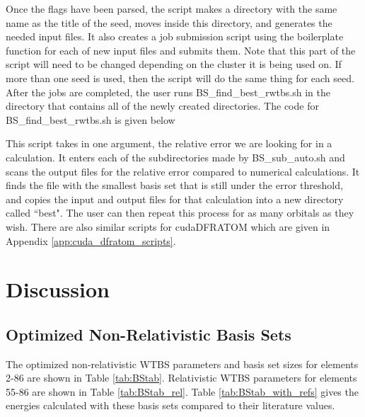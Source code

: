 Once the flags have been parsed, the script makes a directory with the same name as the title of the seed, moves inside this directory, and generates the needed input files. It also creates a job submission script using the boilerplate function for each of new input files and submits them. Note that this part of the script will need to be changed depending on the cluster it is being used on. If more than one seed is used, then the script will do the same thing for each seed. After the jobs are completed, the user runs BS\_find\_best\_rwtbs.sh in the directory that contains all of the newly created directories. The code for BS\_find\_best\_rwtbs.sh is given below



This script takes in one argument, the relative error we are looking for in a calculation. It enters each of the subdirectories made by BS\_sub\_auto.sh and scans the output files for the relative error compared to numerical calculations. It finds the file with the smallest basis set that is still under the error threshold, and copies the input and output files for that calculation into a new directory called ``best". The user can then repeat this process for as many orbitals as they wish. There are also similar scripts for cudaDFRATOM which are given in Appendix \ref{app:cuda_dfratom_scripts}.

\section{Discussion}
\subsection{Optimized Non-Relativistic Basis Sets}
The optimized non-relativistic WTBS parameters and basis set sizes for elements 2-86 are shown in Table \ref{tab:BStab}. Relativistic WTBS parameters for elements 55-86 are shown in Table \ref{tab:BStab_rel}. Table \ref{tab:BStab_with_refs} gives the energies calculated with these basis sets compared to their literature values.

